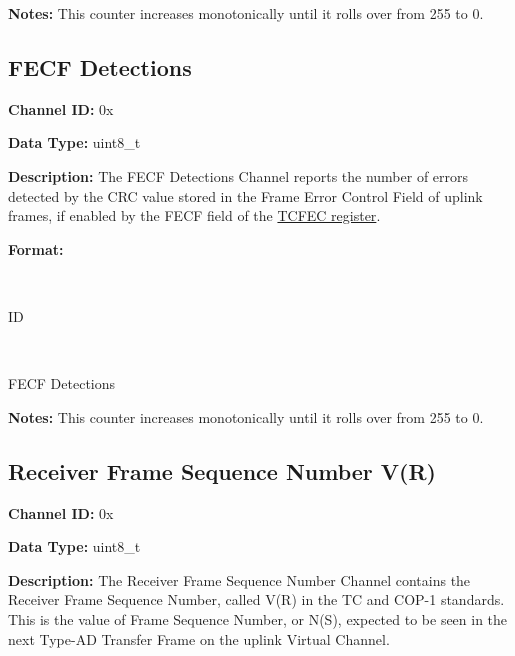 \documentclass{hitec}
\newcounter{idval}
\newcommand*{\elyid}[0]{0x\padzeroes[2]\Hexadecimal{idval}\addtocounter{idval}{1}}
\newcommand*{\currid}[0]{%
		\addtocounter{idval}{-1}%
		0x\padzeroes[2]\Hexadecimal{idval}%
		\addtocounter{idval}{1}%
}
\begin{document}
\noindent \textbf{Notes:} This counter increases monotonically until it rolls
over from 255 to 0.

\subsection{FECF Detections}
\label{chan:sdlpcrc}

\noindent \textbf{Channel ID:} \elyid 

\noindent \textbf{Data Type:} uint8\_t

\noindent \textbf{Description:} The FECF Detections Channel reports the number
of errors detected by the CRC value stored in the Frame Error Control Field of
uplink frames, if enabled by the FECF field of the \hyperref[reg:tcfec]{TCFEC
register}.

\noindent \textbf{Format:}
\newline
\newline
\begin{center}
\begin{bytefield}[endianness=big,bitwidth=2.25em]{8}
		\\
		\begin{rightwordgroup}{ID}
				\bitbox{8}{\currid}
		\end{rightwordgroup}\\
		\begin{rightwordgroup}{FECF Detections}
		\end{rightwordgroup}
\end{bytefield}
		\end{center}

\noindent \textbf{Notes:} This counter increases monotonically until it rolls
over from 255 to 0.

\subsection{Receiver Frame Sequence Number V(R)}
\label{chan:sdlpvr}

\noindent \textbf{Channel ID:} \elyid 

\noindent \textbf{Data Type:} uint8\_t

\noindent \textbf{Description:} The Receiver Frame Sequence Number Channel
contains the Receiver Frame Sequence Number, called V(R) in the TC and COP-1
standards. This is the value of Frame Sequence Number, or N(S), expected to be
seen in the next Type-AD Transfer Frame on the uplink Virtual Channel.
\end{document}
